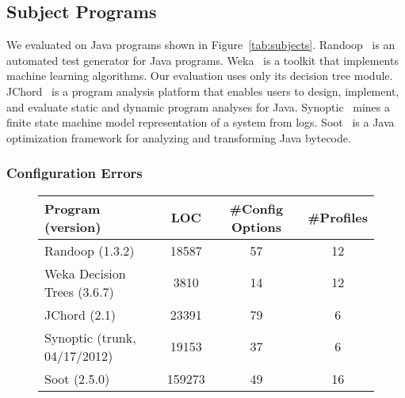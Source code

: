 \vspace{-1mm}
\vspace{-1mm}

\subsection{Subject Programs}

\vspace{-1mm}

We evaluated \ourtool on \subjectnum Java programs shown
in Figure~\ref{tab:subjects}.
Randoop~\cite{PachecoLET2007} is an automated test generator
for Java programs. Weka~\cite{weka} is a toolkit that implements
machine learning algorithms. Our evaluation
uses only its decision tree module. JChord~\cite{jchord}
is a program analysis platform that enables users to design, implement,
and evaluate static and dynamic program analyses for Java.
Synoptic~\cite{synoptic} mines a finite state machine
model representation of a system from logs.
Soot~\cite{soot} is a Java optimization framework for analyzing and transforming Java bytecode.



\subsubsection{Configuration Errors}

\vspace{-1mm}

\begin{figure}[t]
\vspace{1mm}
\centering
\small{
\setlength{\tabcolsep}{.50\tabcolsep}
\begin{tabular}{|l|c|c|c|}
\hline
 Program (version) & LOC & \#Config Options & \#Profiles\\
 \hline
 \hline
 Randoop (1.3.2) & 18587 & 57 & 12\\
 Weka Decision Trees (3.6.7) & 3810 & 14 & 12\\
 JChord (2.1) & 23391 &  79 & 6 \\
 Synoptic (trunk, 04/17/2012) & 19153 & 37 & 6\\
 Soot (2.5.0) & 159273 & 49 & 16 \\
\hline
\end{tabular}
}
\vspace{-2mm}
\end{figure}


